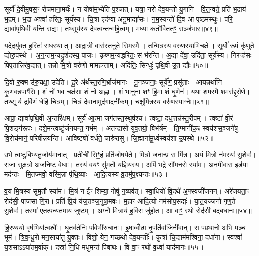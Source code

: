सूर्यो॑ दे॒वीमु॒षस॒ꣳ॒ रोच॑माना॒मर्यः॑।
न योषा॑म॒भ्ये॑ति प॒श्चात्।
यत्रा॒ नरो॑ देव॒यन्तो॑ यु॒गानि॑।
वि॒त॒न्वते॒ प्रति॑ भ॒द्राय॑ भ॒द्रम्।
भ॒द्रा अश्वा॑ ह॒रितः॒ सूर्य॑स्य।
चि॒त्रा एद॑ग्वा अनु॒माद्या॑सः।
न॒म॒स्यन्तो॑ दि॒व आ पृ॒ष्ठम॑स्थुः।
परि॒ द्यावा॑पृथि॒वी य॑न्ति स॒द्यः।
तथ्सूर्य॑स्य देव॒त्वन्तन्म॑हि॒त्वम्।
म॒ध्या कर्तो॒र्वित॑त॒ꣳ॒ सञ्ज॑भार॥४९॥

य॒देदयु॑क्त ह॒रितः॑ स॒धस्थात्।
आद्रात्री॒ वास॑स्तनुते सि॒मस्मै।
तन्मि॒त्रस्य॒ वरु॑णस्याभि॒चक्षे।
सूर्यो॑ रू॒पं कृ॑णुते॒ द्योरु॒पस्थे।
अ॒न॒न्तम॒न्यद्रुश॑दस्य॒ पाजः॑।
कृ॒ष्णम॒न्यद्ध॒रितः॒ सं भ॑रन्ति।
अ॒द्या दे॑वा॒ उदि॑ता॒ सूर्य॑स्य।
निरꣳह॑सः पिपृ॒तान्निर॑व॒द्यात्।
तन्नो॑ मि॒त्रो वरु॑णो मामहन्ताम्।
अदि॑तिः॒ सिन्धुः॑ पृथि॒वी उ॒त द्यौः॥५०॥

दि॒वो रु॒क्म उ॑रु॒चक्षा॒ उदे॑ति।
दू॒रे अ॑र्थस्त॒रणि॒र्भ्राज॑मानः।
नू॒नञ्जनाः॒ सूर्ये॑ण॒ प्रसू॑ताः।
आयन्नर्था॑नि कृ॒णव॒न्नपाꣳ॑सि।
शं नो॑ भव॒ चक्ष॑सा॒ शं नो॒ अह्ना।
शं भा॒नुना॒ शꣳ हि॒मा शं घृ॒णेन॑।
यथा॒ शम॒स्मै शमस॑द्दुरो॒णे।
तथ्सूर्य॒ द्रवि॑णं धे॒हि चि॒त्रम्।
चि॒त्रं दे॒वाना॒मुद॑गा॒दनी॑कम्।
चक्षु॑र्मि॒त्रस्य॒ वरु॑णस्या॒ग्नेः॥५१॥

आप्रा॒ द्यावा॑पृथि॒वी अ॒न्तरि॑क्षम्।
सूर्य॑ आ॒त्मा जग॑तस्त॒स्थुष॑श्च।
त्वष्टा॒ दध॒त्तन्न॑स्तु॒रीपम्।
त्वष्टा॑ वी॒रं पि॒शङ्ग॑रूपः।
दशे॒मन्त्वष्टु॑र्जनयन्त॒ गर्भम्।
अत॑न्द्रासो युव॒तयो॒ बिभ॑र्त्रम्।
ति॒ग्मानी॑क॒ꣴ॒ स्वय॑शस॒ञ्जने॑षु।
वि॒रोच॑मानं॒ परि॑षीन्नयन्ति।
आविष्ट्यो॑ वर्धते॒ चारु॑रासु।
जि॒ह्माना॑मू॒र्ध्वस्वय॑शा उ॒पस्थे॥५२॥

उ॒भे त्वष्टु॑र्बिभ्यतु॒र्जाय॑मानात्।
प्र॒तीची॑ सि॒ꣳ॒हं प्रति॑जोषयेते।
मि॒त्रो जना॒न्प्र स मि॑त्र।
अ॒यं मि॒त्रो न॑म॒स्यः॑ सु॒शेवः॑।
राजा॑ सुक्ष॒त्रो अ॑जनिष्ट वे॒धाः।
तस्य॑ व॒यꣳ सु॑म॒तौ य॒ज्ञिय॑स्य।
अपि॑ भ॒द्रे सौ॑मन॒से स्या॑म।
अ॒न॒मी॒वास॒ इड॑या॒ मद॑न्तः।
मि॒तज्म॑वो॒ वरि॑म॒न्ना पृ॑थि॒व्याः।
आ॒दि॒त्यस्य॑ व्र॒तमु॑प॒क्ष्यन्तः॑॥५३॥

व॒यं मि॒त्रस्य॑ सुम॒तौ स्या॑म।
मि॒त्रं न ईꣳ शिम्या॒ गोषु॑ ग॒व्यव॑त्।
स्वा॒धियो॑ वि॒दथे॑ अ॒फ्स्वजी॑जनन्।
अरे॑जयता॒ꣳ॒ रोद॑सी॒ पाज॑सा गि॒रा।
प्रति॑ प्रि॒यं य॑ज॒तञ्ज॒नुषा॒मवः॑।
म॒हाꣳ आ॑दि॒त्यो नम॑सोप॒सद्यः॑।
या॒त॒यज्ज॑नो गृण॒ते सु॒शेवः॑।
तस्मा॑ ए॒तत्पन्य॑तमाय॒ जुष्टम्।
अ॒ग्नौ मि॒त्राय॑ ह॒विरा जु॑होत।
आ वा॒ꣳ॒ रथो॒ रोद॑सी बद्बधा॒नः॥५४॥

हि॒र॒ण्ययो॒ वृष॑भिर्या॒त्वश्वैः᳚।
घृ॒तव॑र्तनिः प॒विभी॑रुचा॒नः।
इ॒षाव्वोँ॒ढा नृ॒पति॑र्वा॒जिनी॑वान्।
स प॑प्रथा॒नो अ॒भि पञ्च॒ भूम॑।
त्रि॒व॒न्धु॒रो मन॒साया॑तु यु॒क्तः।
विशो॒ येन॒ गच्छ॑थो देव॒यन्तीः᳚।
कुत्रा॑ चि॒द्याम॑मश्विना॒ दधा॑ना।
स्वश्वा॑ य॒शसा\-ऽऽया॑तम॒र्वाक्।
दस्रा॑ नि॒धिं मधु॑मन्तं पिबाथः।
वि वा॒ꣳ॒ रथो॑ व॒ध्वा॑ याद॑मानः॥५५॥

